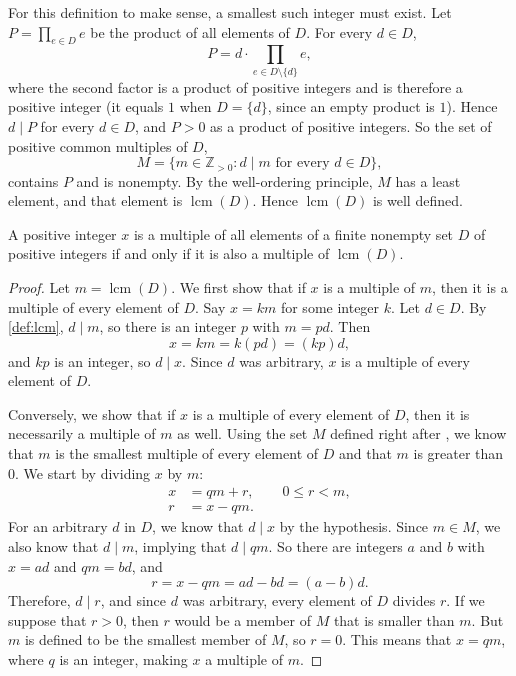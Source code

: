 \documentclass{article}
\begin{document}
For this definition to make sense, a smallest such integer must exist. Let $P = \prod_{e \in D} e$ be the product of
all elements of $D$. For every $d \in D$,
\[
  P = d \cdot \prod_{e \in D \setminus \{d\}} e,
\]
where the second factor is a product of positive integers and is therefore a positive integer (it equals $1$ when
$D = \{d\}$, since an empty product is $1$). Hence $d \mid P$ for every $d \in D$, and $P > 0$ as a product of
positive integers. So the set of positive common multiples of $D$,
\[
  M = \{ m \in \mathbb{Z}_{>0} : d \mid m \text{ for every } d \in D \},
\]
contains $P$ and is nonempty. By the well-ordering principle, $M$ has a least element, and that element is
$\operatorname{lcm}(D)$. Hence $\operatorname{lcm}(D)$ is well defined.

\begin{lemma}\label{lem:multiple}
  A positive integer $x$ is a multiple of all elements of a finite nonempty set $D$ of positive integers if and only if
  it is also a multiple of $\operatorname{lcm}(D)$.
\end{lemma}
\begin{proof}
  Let $m = \operatorname{lcm}(D)$. We first show that if $x$ is a multiple of $m$, then it is a multiple of every
  element of $D$. Say $x = km$ for some integer $k$. Let $d \in D$. By \cref{def:lcm}, $d \mid m$, so there is an
  integer $p$ with $m = pd$. Then
  \[
    x = km = k(pd) = (kp)d,
  \]
  and $kp$ is an integer, so $d \mid x$. Since $d$ was arbitrary, $x$ is a multiple of every element of $D$.
  
  Conversely, we show that if $x$ is a multiple of every element of $D$, then it is necessarily a multiple of $m$ as
  well. Using the set $M$ defined right after , we know that $m$ is the smallest multiple of every
  element of $D$ and that $m$ is greater than $0$. We start by dividing $x$ by $m$:
  \begin{align*}
    x &= qm + r, \qquad 0 \le r < m, \\
    r &= x - qm.
  \end{align*}
  For an arbitrary $d$ in $D$, we know that $d \mid x$ by the hypothesis. Since $m \in M$, we also know that
  $d \mid m$, implying that $d \mid qm$. So there are integers $a$ and $b$ with $x = ad$ and $qm = bd$, and
  \[
    r = x - qm = ad - bd = (a - b)d.
  \]
  Therefore, $d \mid r$, and since $d$ was arbitrary, every element of $D$ divides $r$. If we suppose that $r > 0$, then $r$ would be a member of $M$ that is smaller than $m$. But $m$ is
  defined to be the smallest member of $M$, so $r = 0$. This means that $x = qm$, where $q$ is an integer, making $x$
  a multiple of $m$.
\end{proof}
\end{document}
